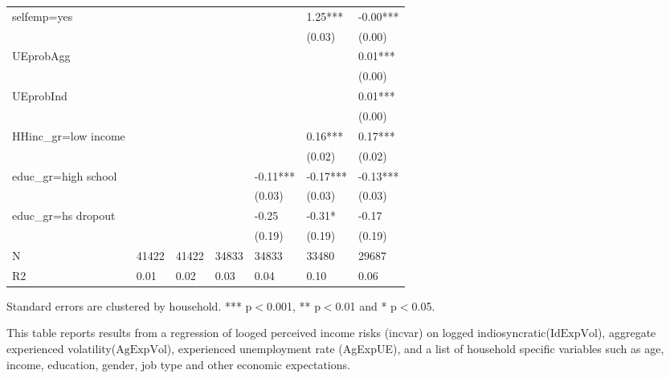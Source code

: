 \begin{table}[p]
\begin{adjustbox}{width=\textwidth}
\begin{threeparttable}
\begin{tabular}{lllllll}
selfemp=yes         &           &           &            &             &      1.25*** &      -0.00*** \\
                    &           &           &            &             &       (0.03) &        (0.00) \\
UEprobAgg           &           &           &            &             &              &       0.01*** \\
                    &           &           &            &             &              &        (0.00) \\
UEprobInd           &           &           &            &             &              &       0.01*** \\
                    &           &           &            &             &              &        (0.00) \\
HHinc\_gr=low income &           &           &            &             &      0.16*** &       0.17*** \\
                    &           &           &            &             &       (0.02) &        (0.02) \\
educ\_gr=high school &           &           &            &    -0.11*** &     -0.17*** &      -0.13*** \\
                    &           &           &            &      (0.03) &       (0.03) &        (0.03) \\
educ\_gr=hs dropout  &           &           &            &       -0.25 &       -0.31* &         -0.17 \\
                    &           &           &            &      (0.19) &       (0.19) &        (0.19) \\
N                   &     41422 &     41422 &      34833 &       34833 &        33480 &         29687 \\
R2                  &      0.01 &      0.02 &       0.03 &        0.04 &         0.10 &          0.06 \\
\bottomrule
\end{tabular}
\begin{tablenotes}\item Standard errors are clustered by household. *** p$<$0.001, ** p$<$0.01 and * p$<$0.05. 
\item This table reports results from a regression of looged perceived income risks (incvar) on logged indiosyncratic($\text{IdExpVol}$), aggregate experienced volatility($\text{AgExpVol}$), experienced unemployment rate (AgExpUE), and a list of household specific variables such as age, income, education, gender, job type and other economic expectations.
\end{tablenotes}
\end{threeparttable}
\end{adjustbox}
\end{table}
